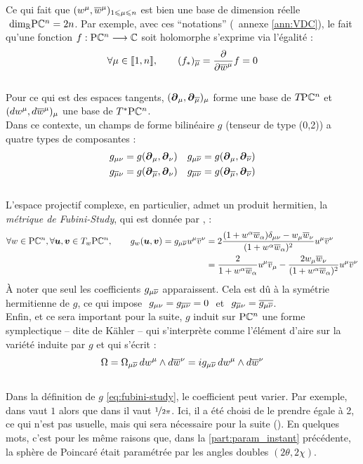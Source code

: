 Ce qui fait que $(w^\mu, \congu{w}^\mu)_{1\leq \mu \leq n}$ est bien une base de dimension réelle $\ \dim[\R]\PC{n} = 2n$. Par exemple, avec ces ``notations'' (\cf~annexe \ref{ann:VDC}), le fait qu'une fonction $f: \PC{n}\lr \C$ soit holomorphe s'exprime via l'égalité :
\[\forall \mu\in\llbracket1,n\rrbracket,\qquad (f_*)_{\congu{\mu}} = \frac{\partial}{\partial \congu{w}^\mu}f = 0\] 
\\
Pour ce qui est des espaces tangents, $(\bt_\mu, \bt_{\congu{\mu}})_\mu$ forme une base de $\tg{\PC{n}}$ et $(dw^\mu, d\congu{w}^\mu)_\mu$ une base de $\tg{^* \PC{n}}$.
\\
Dans ce contexte, un champs de forme bilinéaire $g$ (tenseur de type (0,2)) a quatre types de composantes :
\begin{align*}
	g_{\mu \nu} &= g(\bt_{\mu}, \bt_{\nu})  &  g_{\mu \congu{\nu}} &= g(\bt_{\mu}, \bt_{\congu{\nu}}) \\
	g_{\congu{\mu} \nu} &= g(\bt_{\congu{\mu}}, \bt_{\nu})  &  g_{\congu{\mu} \congu{\nu}} &= g(\bt_{\congu{\mu}}, \bt_{\congu{\nu}})
\end{align*}
\\
L'espace projectif complexe, en particulier, admet un produit hermitien, la \emph{métrique de Fubini-Study}, qui est donnée par \cite[sec. 8.5]{nakahara_geometry_2003}, \cite[chap. 4]{ballmann_lectures_2006} :
\begin{equation} \label{eq:fubini-study}
	\begin{aligned}
		\forall w\in\PC{n}, \forall \bf{u},\bf{v}\in\tg[w]{\PC{n}},\qquad g_w(\bf{u}, \bf{v}) = g_{\mu\congu{\nu}} u^\mu \congu{v}^\nu 
		&= 2\frac{(1+w^\alpha \congu{w}_\alpha)\delta_{\mu\nu} - w_\mu \congu{w}_\nu}{(1+w^\alpha \congu{w}_\alpha)^2}u^\mu \congu{v}^\nu \\
		&= \frac{2}{1+w^\alpha \congu{w}_\alpha} u^\mu \congu{v}_\mu - \frac{2w_\mu \congu{w}_\nu}{(1+w^\alpha \congu{w}_\alpha)^2} u^\mu \congu{v}^\nu
	\end{aligned}
\end{equation}
À noter que seul les coefficients $g_{\mu \congu{\nu}}$ apparaissent. Cela est dû à la symétrie hermitienne de $g$, ce qui impose $\ g_{\mu\nu} = g_{\congu{\mu\nu}} = 0\ $ et $\ g_{\congu{\mu} \nu} = \congu{g_{\mu \congu{\nu}}}$.
\\
Enfin, et ce sera important pour la suite, $g$ induit sur $\PC{n}$ une forme symplectique -- dite de Kähler -- qui s'interprète comme l'élément d'aire sur la variété induite par $g$ et qui s'écrit :
\[\Omega = \Omega_{\mu\congu{\nu}}\, dw^\mu \wedge d\congu{w}^\nu 
	= ig_{\mu \congu{\nu}}\, dw^\mu \wedge d\congu{w}^\nu\]
\\
Dans la définition de $g$ \eqref{eq:fubini-study}, le coefficient peut varier. Par exemple, dans \cite{nakahara_geometry_2003} vaut $1$ alors que dans \cite{huybrechts_complex_2005} il vaut $\nicefrac{1}{2\pi}$. 
Ici, il a été choisi de le prendre égale à 2, ce qui n'est pas usuelle, mais qui sera nécessaire pour la suite ().
En quelques mots, c'est pour les même raisons que, dans la \cref{part:param_instant} précédente, la sphère de Poincaré était paramétrée par les angles doubles $(2\theta, 2\chi)$.
\skipl





